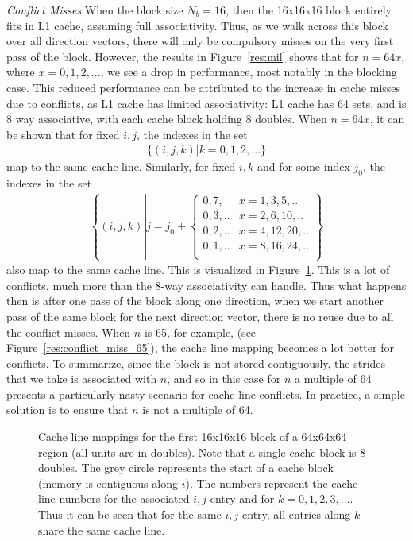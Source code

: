 \documentclass[letterpaper]{article}
\newcommand\inputpgf[2]{{
\let\pgfimageWithoutPath\pgfimage
\renewcommand{\pgfimage}[2][]{\pgfimageWithoutPath[##1]{#1/##2}}

}}
\begin{document}
\textit{Conflict Misses}
When the block size $N_b = 16$, then the 16x16x16 block entirely fits in L1 cache, assuming full associativity. Thus, as we walk across this block over all direction vectors, there will only be compulsory misses on the very first pass of the block. However, the results in Figure~\ref{res:mil} shows that for $n=64x$, where $x=0,1,2,...$, we see a drop in performance, most notably in the blocking case. This reduced performance can be attributed to the increase in cache misses due to conflicts, as L1 cache has limited associativity: L1 cache has 64 sets, and is 8 way associative, with each cache block holding 8 doubles. When $n=64x$, it can be shown that for fixed $i,j$, the indexes in the set 
\begin{align}
  \{(i,j,k) | k=0,1,2,... \}
\end{align}
map to the same cache line. Similarly, for fixed $i,k$ and for some index $j_0$, the indexes in the set
\begin{align}
  \left\{(i,j,k) \left| j = j_0 + \begin{cases}
                    0,7, & x=1,3,5,..\\
                    0,3,.. &x=2,6,10,..\\
                    0,2,.. &x=4,12,20,..\\
                    0,1,.. &x=8,16,24,..\\
                              \end{cases}
  \right. \right\}
\end{align}
also map to the same cache line. This is visualized in Figure~\ref{res:conflict_miss_64}. This is a lot of conflicts, much more than the 8-way associativity can handle. Thus what happens then is after one pass of the block along one direction, when we start another pass of the same block for the next direction vector, there is no reuse due to all the conflict misses. When $n$ is 65, for example, (see Figure~\ref{res:conflict_miss_65}), the cache line mapping becomes a lot better for conflicts. To summarize, since the block is not stored contiguously, the strides that we take is associated with $n$, and so in this case for $n$ a multiple of 64 presents a particularly nasty scenario for cache line conflicts. In practice, a simple solution is to ensure that $n$ is not a multiple of 64. 
\begin{figure}[H]
  \inputpgf{figs/conflict_miss}{mil_blocking_conflicts_64.pgf}\vspace{-1cm}
  \caption{Cache line mappings for the first 16x16x16 block of a 64x64x64 region (all units are in doubles). Note that a single cache block is 8 doubles. The grey circle represents the start of a cache block (memory is contiguous along $i$). The numbers represent the cache line numbers for the associated $i,j$ entry and for $k=0,1,2,3,...$. Thus it can be seen that for the same $i,j$ entry, all entries along $k$ share the same cache line. }
  \label{res:conflict_miss_64}
\end{figure}
\end{document}
